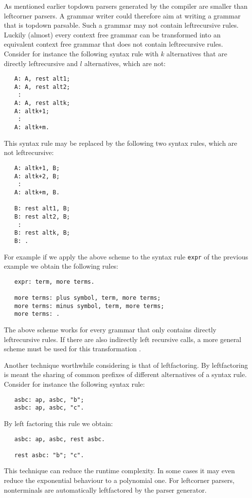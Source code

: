 As mentioned earlier topdown parsers generated by the compiler are
smaller than leftcorner parsers. A grammar writer could therefore
aim at writing a grammar that is topdown parsable. Such a grammar
may not contain leftrecursive rules. Luckily (almost) every context
free grammar can be transformed into an equivalent context free
grammar that does not contain leftrecursive rules. Consider for
instance the following syntax rule with $k$ alternatives that are
directly leftrecursive and $l$ alternatives, which are not:
\begin{verbatim}
   A: A, rest alt1;
   A: A, rest alt2;
    :
   A: A, rest altk;
   A: altk+1;
    :
   A: altk+m.
\end{verbatim}
This syntax rule may be replaced by the following two syntax rules, which
are not leftrecursive:
\begin{verbatim}
   A: altk+1, B;
   A: altk+2, B;
    : 
   A: altk+m, B.

   B: rest alt1, B;
   B: rest alt2, B;
    :
   B: rest altk, B;
   B: .
\end{verbatim}
For example if we apply the above scheme to the syntax rule {\tt expr}
of the previous example we obtain the following rules:
\begin{verbatim}
   expr: term, more terms.

   more terms: plus symbol, term, more terms;
   more terms: minus symbol, term, more terms;
   more terms: .
\end{verbatim}
The above scheme works for every grammar that only contains
directly leftrecursive rules. If there are also indirectly
left recursive calls, a more general scheme must be used for
this transformation \cite{aho}.

Another technique worthwhile considering is that of leftfactoring.
By leftfactoring is meant the sharing of common prefixes of different
alternatives of a syntax rule. Consider for instance the following
syntax rule:
\begin{verbatim}
   asbc: ap, asbc, "b";
   asbc: ap, asbc, "c".
\end{verbatim}
By left factoring this rule we obtain:
\begin{verbatim}
   asbc: ap, asbc, rest asbc.

   rest asbc: "b"; "c".
\end{verbatim}
This technique can reduce the runtime complexity. In some cases it
may even reduce the exponential behaviour to a polynomial one. For
leftcorner parsers, nonterminals are automatically leftfactored by
the parser generator.
